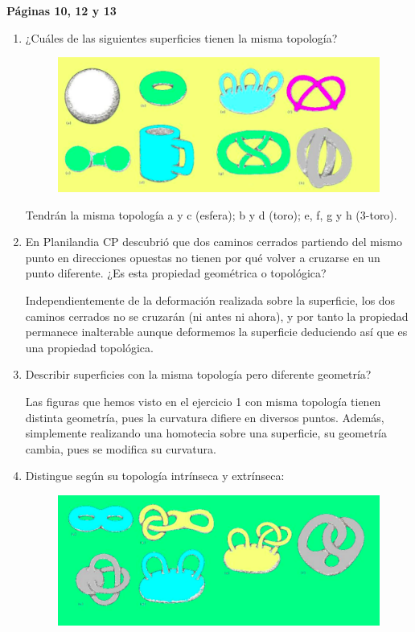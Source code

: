 \textbf{Páginas 10, 12 y 13}
\begin{enumerate}
\item ¿Cuáles de las siguientes superficies tienen la misma topología?

\begin{figure}[H]
\centering
\includegraphics[scale=0.5]{images/universo/pagina_10_1.png}
\end{figure}
Tendrán la misma topología a y c (esfera); b y d (toro); e, f, g y h (3-toro).

\item En Planilandia CP descubrió que dos caminos cerrados partiendo del mismo punto en direcciones opuestas no tienen por qué volver a cruzarse en un punto diferente. ¿Es esta propiedad geométrica o topológica?

Independientemente de la deformación realizada sobre la superficie, los dos
caminos cerrados no se cruzarán (ni antes ni ahora), y por tanto la propiedad permanece inalterable aunque deformemos la superficie deduciendo así que es una propiedad topológica.

\item Describir superficies con la misma topología pero diferente geometría?

Las figuras que hemos visto en el ejercicio 1 con misma topología tienen distinta geometría, pues la curvatura difiere en diversos puntos. Además, simplemente realizando una homotecia sobre una superficie, su geometría cambia, pues se modifica su curvatura.

\item Distingue según su topología intrínseca y extrínseca:

\begin{figure}[H]
\centering
\includegraphics[scale=0.25]{images/universo/pagina_12_1.png}
\end{figure}


\end{enumerate}
